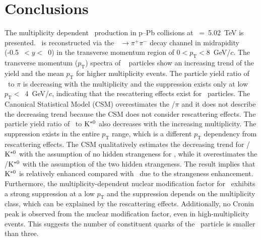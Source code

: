 
\section{Conclusions}
\label{sec:summary}

The multiplicity dependent \fzero~production in p--Pb collisions at \snn~=~5.02~TeV is presented. \fzero~is reconstructed via the \fzero~$\rightarrow\pi^{+}\pi^{-}$ decay channel in midrapidity (-0.5~$<y<$~0) in the transverse momentum region of $0<p_{\mathrm{T}}<8$~GeV/$c$.
The transverse momentum ($p_{\mathrm{T}}$) spectra of \fzero~ particles show an increasing trend of the yield and the mean $p_{\mathrm{T}}$ for higher multiplicity events. The particle yield ratio of \fzero~to $\pi$ is decreasing with the multiplicity and the suppression exists only at low $p_{\mathrm{T}}<$~4~GeV/$c$, indicating that the rescattering effects exist for \fzero~particles. The Canonical Statistical Model (CSM) overestimates the \fzero/$\pi$ and it does not describe the decreasing trend because the CSM does not consider rescattering effects. The particle yield ratio of \fzero~to $\rm{}K^{*0}$ also decreases with the increasing multiplicity. The suppression exists in the entire $p_{\mathrm{T}}$ range, which is a different $p_{\mathrm{T}}$ dependency from rescattering effects. The CSM qualitatively estimates the decreasing trend for \fzero/$\rm{}K^{*0}$ with the assumption of no hidden strangeness for \fzero, while it overestimates the \fzero/$\rm{}K^{*0}$ with the assumption of the two hidden strangeness. The result implies that $\rm{}K^{*0}$ is relatively enhanced compared with \fzero~due to the strangeness enhancement. Furthermore, the multiplicity-dependent nuclear modification factor for \fzero~exhibits a strong suppression at a low $p_{\mathrm{T}}$ and the suppression depends on the multiplicity class, which can be explained by the rescattering effects. Additionally, no Cronin peak is observed from the nuclear modification factor, even in high-multiplicity events. This suggests the number of constituent quarks of the \fzero~particle is smaller than three.